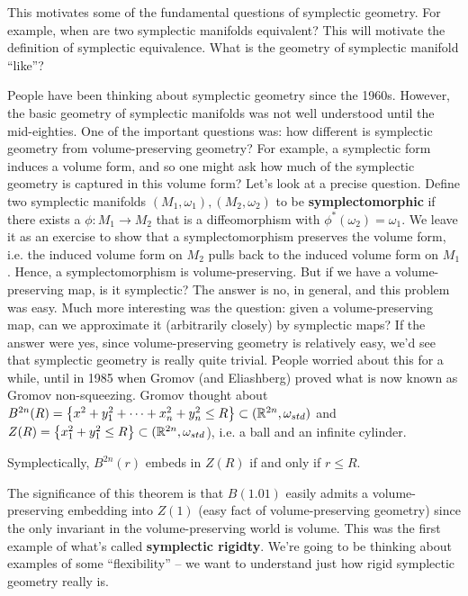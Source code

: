 \documentclass{../mathnotes}
\begin{document}
This motivates some of the fundamental questions of symplectic geometry. For example, when are two symplectic manifolds equivalent? This will motivate
the definition of symplectic equivalence. What is the geometry of symplectic manifold ``like''?

People have been thinking about symplectic geometry since the 1960s. However, the basic geometry of symplectic manifolds was not well understood until
the mid-eighties. One of the important questions was: how different is symplectic geometry from volume-preserving geometry? For example, a symplectic form
induces a volume form, and so one might ask how much of the symplectic geometry is captured in this volume form? Let's look at a precise question.
Define two symplectic manifolds $(M_1,\omega_1),(M_2,\omega_2)$ to be \textbf{symplectomorphic} if there exists a $\phi:M_1\to M_2$ that is a
diffeomorphism with $\phi^*(\omega_2)=\omega_1$. We leave it as an exercise to show that a symplectomorphism preserves the volume form, i.e. the induced volume
form on $M_2$ pulls back to the induced volume form on $M_1$. Hence, a symplectomorphism is volume-preserving. But if we have a volume-preserving map,
is it symplectic? The answer is no, in general, and this problem was easy. Much more interesting was the question: given a volume-preserving map,
can we approximate it (arbitrarily closely) by symplectic maps? If the answer were yes, since volume-preserving geometry is relatively easy, we'd see that
symplectic geometry is really quite trivial. People worried about this for a while, until in 1985 when Gromov (and Eliashberg) proved what is now
known as Gromov non-squeezing. Gromov thought about $B^{2n}(R)=\left\{ x^2+y_1^2+\cdots+x_n^2+y_n^2\leq R \right\}\subset(\mathbb{R}^{2n},\omega_{std})$
and $Z(R)=\left\{ x_1^2+y_1^2\leq R \right\}\subset (\mathbb{R}^{2n},\omega_{std}$), i.e. a ball and an infinite cylinder. 

\begin{thm}
    Symplectically, $B^{2n}(r)$ embeds in $Z(R)$ if and only if $r\leq R$.
\end{thm}

The significance of this theorem is that $B(1.01)$ easily admits a volume-preserving embedding into $Z(1)$ (easy fact of volume-preserving geometry) since the only
invariant in the volume-preserving world is volume. This was the first example of what's called \textbf{symplectic rigidty}.
We're going to be thinking about examples of some ``flexibility'' -- we want to understand just how rigid symplectic geometry really is.
\end{document}
